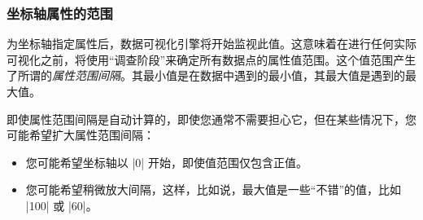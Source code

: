 \subsubsection{坐标轴属性的范围}


为坐标轴指定属性后，数据可视化引擎将开始监视此值。这意味着在进行任何实际可视化之前，将使用``调查阶段''来确定所有数据点的属性值范围。这个值范围产生了所谓的\emph{属性范围间隔}。其最小值是在数据中遇到的最小值，其最大值是遇到的最大值。


即使属性范围间隔是自动计算的，即使您通常不需要担心它，但在某些情况下，您可能希望扩大属性范围间隔：
%
\begin{itemize}
    \item 您可能希望坐标轴以 |0| 开始，即使值范围仅包含正值。
    \item 您可能希望稍微放大间隔，这样，比如说，最大值是一些``不错''的值，比如 |100| 或 |60|。
\end{itemize}


